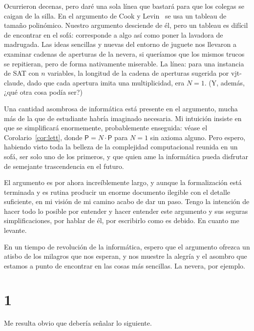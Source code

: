 \documentclass[11pt,a4paper]{amsart}
\theoremstyle{remark}
\begin{document}
Ocurrieron decenas, pero daré una sola línea que bastará para que los colegas
se caigan de la silla. En el argumento de Cook y Levin~\cite{cook,levin} se
usa un tableau de tamaño polinómico. Nuestro argumento desciende de él, pero
un tableau es difícil de encontrar en el sofá: corresponde a algo así como
poner la lavadora de madrugada. Las ideas sencillas y nuevas del entorno de
juguete nos llevaron a examinar cadenas de aperturas de la nevera, si
queríamos que los mismos trucos se repitieran, pero de forma nativamente
miserable. La línea: para una instancia de SAT con $n$ variables, la longitud
de la cadena de aperturas sugerida por vjt-claude, dado que cada apertura
imita una multiplicidad, era $N = 1$. (Y, además, ¿qué otra cosa podía ser?)

Una cantidad asombrosa de informática está presente en el argumento, mucha más
de la que de estudiante habría imaginado necesaria. Mi intuición insiste en
que se simplificará enormemente, probablemente enseguida: véase el
Corolario~\ref{cor:lett}, donde $\mathsf{P} = N \cdot \mathsf{P}$ para $N = 1$
sin axioma alguno. Pero espero, habiendo visto toda la belleza de la
complejidad computacional reunida en un sofá, ser solo uno de los primeros, y
que quien ame la informática pueda disfrutar de semejante trascendencia en el
futuro.

El argumento es por ahora increíblemente largo, y aunque la formalización está
terminada y es rutina producir un enorme documento ilegible con el detalle
suficiente, en mi visión de mi camino acabo de dar un paso. Tengo la intención
de hacer todo lo posible por entender y hacer entender este argumento y sus
seguras simplificaciones, por hablar de él, por escribirlo como es debido. En
cuanto me levante.

En un tiempo de revolución de la informática, espero que el argumento ofrezca
un atisbo de los milagros que nos esperan, y nos muestre la alegría y el
asombro que estamos a punto de encontrar en las cosas más sencillas. La
nevera, por ejemplo.

\section*{1}

Me resulta obvio que debería señalar lo siguiente.
\end{document}
